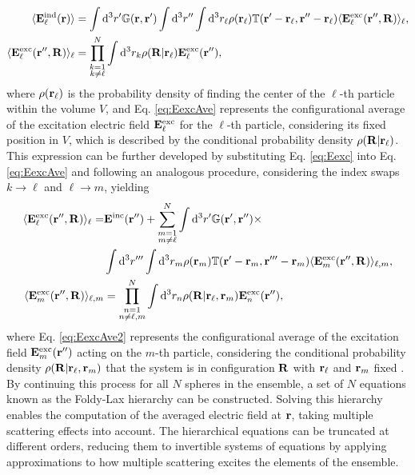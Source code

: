 %
\begin{subequations}%
	\begin{align}%
		\langle \vb{E}^\text{ind}_\ell(\vb{r}) \rangle &= \int\dd^3 r'\mathbb{G}(\vb{r},\vb{r}')
		\int\dd^3 r'' \int \dd^3 r_\ell \rho(\vb{r}_\ell) \mathbb{T}(\vb{r}'-\vb{r}_\ell,\vb{r}''-\vb{r}_\ell)
		\langle \vb{E}_\ell^\text{exc}(\vb{r}'',\vb{R})\rangle_\ell,%
		\\
		\langle \vb{E}_\ell^\text{exc}(\vb{r}'',\vb{R})\rangle_\ell
		&= \prod_{\substack{k =1 \\ k\neq \ell}}^N  \int\dd^3 r_k \rho(\vb{R}|\vb{r}_\ell) \vb{E}^\text{exc}_\ell(\vb{r}''),
		\label{eq:EexcAve}
	\end{align}%
	\label{eq:EexcSSA}%
\end{subequations}%
%
where $\rho(\vb{r}_\ell)$ is the probability density of finding the center of the $\ell$-th particle within the volume $V$, and Eq. \eqref{eq:EexcAve} represents the configurational average of the excitation electric field $\vb{E}_\ell^\text{exc}$ for the $\ell$-th particle, considering its fixed position in $V$, which is described by the conditional probability density $\rho(\vb{R}|\vb{r}_\ell)$. This expression can be further developed by substituting Eq. \eqref{eq:Eexc} into Eq. \eqref{eq:EexcAve} and following an analogous procedure, considering the index swaps $k\to\ell$ and $\ell \to m$, yielding
%
\begin{subequations}%
	\begin{align}%
		\langle \vb{E}_\ell^\text{exc}(\vb{r}'',\vb{R})\rangle_\ell =& \vb{E}^\text{inc}(\vb{r}'')
		+ \sum_{\substack{m =1 \\ m\neq \ell}}^N  \int\dd^3 r' \mathbb{G}(\vb{r}',\vb{r}'') \times \notag\\
		& \int\dd^3 r'''\int \dd^3 r_m \rho(\vb{r}_m) \mathbb{T}(\vb{r}'-\vb{r}_m,\vb{r}'''-\vb{r}_m) \langle \vb{E}_m^\text{exc}(\vb{r}'',\vb{R})\rangle_{\ell,m},
		\\
		\langle \vb{E}_m^\text{exc}(\vb{r}'',\vb{R})\rangle_{\ell,m}
		&= \prod_{\substack{n =1 \\ n\neq \ell,m}}^N  \int\dd^3 r_n \rho(\vb{R}|\vb{r}_\ell,\vb{r}_m) \vb{E}^\text{exc}_n(\vb{r}''),
		\label{eq:EexcAve2}
	\end{align}%
	\label{eq:EexcQSA}%
\end{subequations}%
%
where Eq. \eqref{eq:EexcAve2} represents the configurational average of the excitation field $ \vb{E}_m^\text{exc}(\vb{r}'')$ acting on the $m$-th particle, considering the conditional probability density $\rho(\vb{R}|\vb{r}_\ell,\vb{r}_m)$ that the system is in configuration $\vb{R}$ with $\vb{r}_\ell$ and $\vb{r}_m$ fixed \cite{garcia2012multiple,barrera_coherent_2003}. By continuing this process for all $N$ spheres in the ensemble, a set of $N$ equations known as the Foldy-Lax hierarchy \cite{loiko_monolayers_1998} can be constructed. Solving this hierarchy enables the computation of the averaged electric field at $\vb{r}$, taking multiple scattering effects into account. The hierarchical equations can be truncated at different orders, reducing them to invertible systems of equations by applying approximations to how multiple scattering excites the elements of the ensemble.

